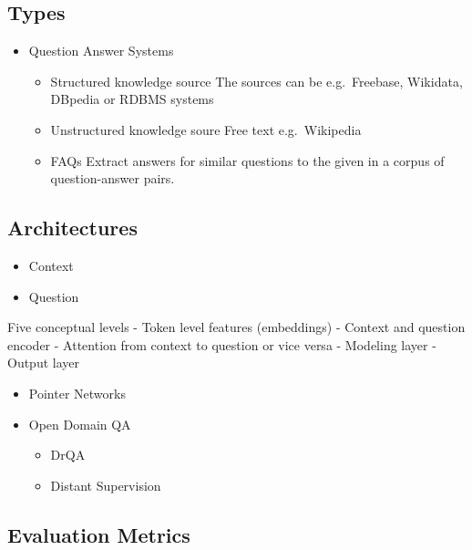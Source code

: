\documentclass[]{krantz}
\providecommand{\tightlist}{%
  \setlength{\itemsep}{0pt}\setlength{\parskip}{0pt}}
\begin{document}
\hypertarget{types}{%
\subsection{Types}\label{types}}

\begin{itemize}
\tightlist
\item
  Question Answer Systems

  \begin{itemize}
  \tightlist
  \item
    Structured knowledge source
    The sources can be e.g.~Freebase, Wikidata, DBpedia or RDBMS systems
  \item
    Unstructured knowledge soure
    Free text e.g.~Wikipedia
  \item
    FAQs
    Extract answers for similar questions to the given in a corpus of question-answer pairs.
  \end{itemize}
\end{itemize}

\hypertarget{architectures}{%
\subsection{Architectures}\label{architectures}}

\begin{itemize}
\tightlist
\item
  Context
\item
  Question
\end{itemize}

Five conceptual levels
- Token level features (embeddings)
- Context and question encoder
- Attention from context to question or vice versa
- Modeling layer
- Output layer

\begin{itemize}
\item
  Pointer Networks
\item
  Open Domain QA

  \begin{itemize}
  \tightlist
  \item
    DrQA
  \item
    Distant Supervision
  \end{itemize}
\end{itemize}

\hypertarget{evaluation-metrics}{%
\subsection{Evaluation Metrics}\label{evaluation-metrics}}
\end{document}
